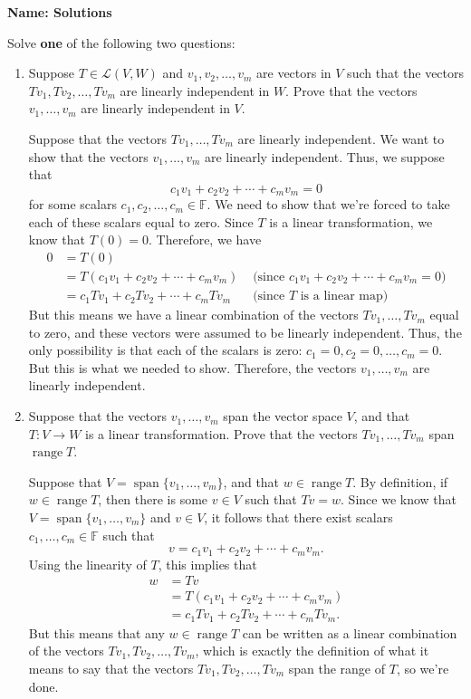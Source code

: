 \documentclass[12pt]{article}
\DeclareMathOperator{\spn}{span}
\DeclareMathOperator{\range}{range}
\begin{document}
\thispagestyle{fancy}
{\bf Name: Solutions}

\bigskip

Solve {\bf one} of the following two questions:
 \begin{enumerate}
 \item  Suppose $T\in\mathcal{L}(V,W)$ and $v_1,v_2,\ldots, v_m$ are vectors in $V$ such that the vectors $Tv_1,Tv_2,\ldots, Tv_m$ are linearly independent in $W$. Prove that the vectors $v_1,\ldots, v_m$ are linearly independent in $V$. 

\bigskip

 Suppose that the vectors $Tv_1,\ldots, Tv_m$ are linearly independent. We want to show that the vectors $v_1,\ldots, v_m$ are linearly independent. Thus, we suppose that
\[
 c_1v_1+c_2v_2+\cdots + c_mv_m = 0
\]
for some scalars $c_1,c_2,\ldots, c_m\in\mathbb{F}$. We need to show that we're forced to take each of these scalars equal to zero. Since $T$ is a linear transformation, we know that $T(0)=0$. Therefore, we have
\begin{align*}
 0& = T(0)\\
 & = T(c_1v_1+c_2v_2+\cdots +c_mv_m) &\text{ (since  } c_1v_1+c_2v_2+\cdots + c_mv_m = 0)\\
 & = c_1Tv_1+c_2Tv_2+\cdots +c_mTv_m &\text{ (since } T \text{ is a linear map)}
\end{align*}
But this means we have a linear combination of the vectors $Tv_1,\ldots, Tv_m$ equal to zero, and these vectors were assumed to be linearly independent. Thus, the only possibility is that each of the scalars is zero: $c_1=0,c_2=0,\ldots, c_m=0$. But this is what we needed to show. Therefore, the vectors $v_1,\ldots, v_m$ are linearly independent.


\bigskip

\item Suppose that the vectors $v_1,\ldots, v_m$ span the vector space $V$, and that $T:V\to W$ is a linear transformation. Prove that the vectors $Tv_1,\ldots, Tv_m$ span $\range T$.

\bigskip

 Suppose that $V=\spn\{v_1,\ldots, v_m\}$, and that $w\in \range T$. By definition, if $w\in \range T$, then there is some $v\in V$ such that $Tv=w$. Since we know that $V=\spn\{v_1,\ldots, v_m\}$ and $v\in V$, it follows that there exist scalars $c_1,\ldots, c_m\in\mathbb{F}$ such that
\[
 v = c_1v_1+c_2v_2+\cdots + c_mv_m.
\]
Using the linearity of $T$, this implies that
\begin{align*}
 w & = Tv\\
 & = T(c_1v_1+c_2v_2+\cdots + c_mv_m)\\
 & = c_1Tv_1+c_2Tv_2+\cdots +c_mTv_m.
\end{align*}
But this means that any $w\in\range T$ can be written as a linear combination of the vectors $Tv_1,Tv_2,\ldots, Tv_m$, which is exactly the definition of what it means to say that the vectors $Tv_1,Tv_2,\ldots, Tv_m$ span the range of $T$, so we're done.

\bigskip

 \end{enumerate}
\end{document}
